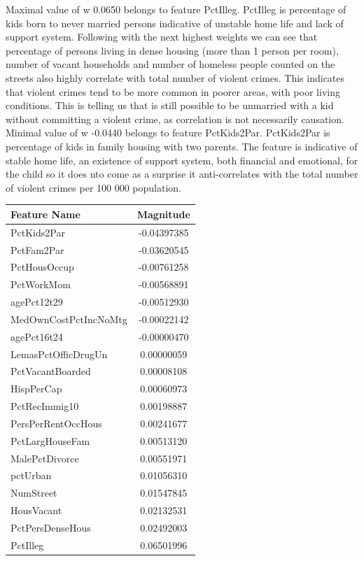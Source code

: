\documentclass{article}
\newcommand{\1}{\mathbf{1}}
\begin{document}
\begin{enumerate}
    Maximal value of w 0.0650 belongs to feature PctIlleg. PctIlleg is percentage of kids born to never married persons indicative of unstable home life and lack of support system. Following with the next highest weights we can see that percentage of persons living in dense housing (more than 1 person per room), number of vacant households and number of homeless people counted on the streets also highly correlate with total number of violent crimes. This indicates that violent crimes tend to be more common in poorer areas, with poor living conditions. This is telling us that is still possible to be unmarried with a kid without committing a violent crime, as correlation is not necessarily causation.  \\
    Minimal value of w -0.0440 belongs to feature PctKids2Par. PctKids2Par is percentage of kids in family housing with two parents. The feature is indicative of stable home life, an existence of support system, both financial and emotional, for the child so it does nto come as a surprise it anti-correlates with the total number of violent crimes per 100 000 population. 

    \begin{table}[h!]
    \centering
        \begin{tabular}{l|c}
        \centering
            Feature Name              &  Magnitude \\
            \hline
            PctKids2Par               & -0.04397385 \\
            PctFam2Par                & -0.03620545 \\
            PctHousOccup              & -0.00761258 \\
            PctWorkMom                & -0.00568891 \\
            agePct12t29               & -0.00512930 \\
            MedOwnCostPctIncNoMtg     & -0.00022142 \\
            agePct16t24               & -0.00000470 \\
            LemasPctOfficDrugUn       & 0.00000059 \\
            PctVacantBoarded          & 0.00008108 \\
            HispPerCap                & 0.00060973 \\
            PctRecImmig10             & 0.00198887 \\
            PersPerRentOccHous        & 0.00241677 \\
            PctLargHouseFam           & 0.00513120 \\
            MalePctDivorce            & 0.00551971 \\
            pctUrban                  & 0.01056310 \\
            NumStreet                 & 0.01547845 \\
            HousVacant                & 0.02132531 \\
            PctPersDenseHous          & 0.02492003 \\
            PctIlleg                  & 0.06501996 
        \end{tabular}{}
    \end{table}{}
    

\end{enumerate}
\end{document}
